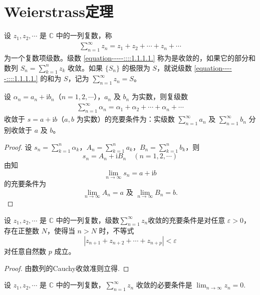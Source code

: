 \documentclass[../../main.tex]{subfiles}
\begin{document}
\section{Weierstrass定理}

\begin{definition}
设 \( z_1, z_2, \cdots \) 是 \( \mathbb{C} \) 中的一列复数，称
\begin{align}
\sum_{n=1}^{\infty} z_n = z_1 + z_2 + \cdots + z_n + \cdots \label{equation-----::::1.1.1.1.}
\end{align}
为一个复数项级数。级数 \eqref{equation-----::::1.1.1.1.} 称为是收敛的，如果它的部分和数列 \( S_n = \sum_{k=1}^{n} z_k \) 收敛。如果 \( \{S_n\} \) 的极限为 \( S \)，就说级数 \eqref{equation-----::::1.1.1.1.} 的和为 \( S \)，记为 \( \sum_{n=1}^{\infty} z_n = S \)。
\end{definition}

\begin{theorem}\label{theorem:复数项级数收敛充要条件}
设 $\alpha_n = a_n + \mathrm{i}b_n$（$n = 1,2,\cdots$），$a_n$ 及 $b_n$ 为实数，则复级数
\begin{align*}
\sum_{n=1}^{\infty}{\alpha _n}=\alpha _1+\alpha _2+\cdots +\alpha _n+\cdots 
\end{align*}
收敛于 $s = a + \mathrm{i}b$（$a,b$ 为实数）的充要条件为：实级数 $\sum_{n = 1}^{\infty} a_n$ 及 $\sum_{n = 1}^{\infty} b_n$ 分别收敛于 $a$ 及 $b$。
\end{theorem}
\begin{proof}
设 $s_n = \sum_{k = 1}^{n} \alpha_k$，$A_n = \sum_{k = 1}^{n} a_k$，$B_n = \sum_{k = 1}^{n} b_k$，则
\[
s_n = A_n + \mathrm{i}B_n \quad (n = 1,2,\cdots)
\]
由知
\[
\lim_{n \to \infty} s_n = a + \mathrm{i}b
\]
的充要条件为
\[
\lim_{n \to \infty} A_n = a \text{ 及 } \lim_{n \to \infty} B_n = b.
\]
\end{proof}

\begin{theorem}[Cauchy收敛准则]
设 \( z_1, z_2, \cdots \) 是 \( \mathbb{C} \) 中的一列复数，级数$\sum_{n=1}^{\infty} z_n$收敛的充要条件是对任意 \( \varepsilon > 0 \)，存在正整数 \( N \)，使得当 \( n > N \) 时，不等式
\[
|z_{n + 1} + z_{n + 2} + \cdots + z_{n + p}| < \varepsilon
\]
对任意自然数 \( p \) 成立。
\end{theorem}
\begin{proof}
由数列的Cauchy收敛准则立得.
\end{proof}

\begin{corollary}\label{corollary:复幂级数收敛必要条件}
设 \( z_1, z_2, \cdots \) 是 \( \mathbb{C} \) 中的一列复数，\( \sum_{n=1}^{\infty} z_n \) 收敛的必要条件是 \( \lim_{n \to \infty} z_n = 0 \).
\end{corollary}
\end{document}
